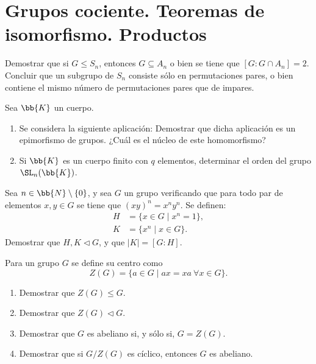 \section{Grupos cociente. Teoremas de isomorfismo. Productos}

\begin{ejercicio}
    Demostrar que si $G\leq S_n$, entonces $G\subseteq A_n$ o bien se tiene que $[G:G\cap A_n]=2$. Concluir que un subgrupo de $S_n$ consiste sólo en permutaciones pares, o bien contiene el mismo número de permutaciones pares que de impares.
\end{ejercicio}

\begin{ejercicio}
    Sea $\bb{K}$ un cuerpo.
    \begin{enumerate}
        \item Se considera la siguiente aplicación:
        Demostrar que dicha aplicación es un epimorfismo de grupos. ¿Cuál es el núcleo de este homomorfismo?

        \item Si $\bb{K}$ es un cuerpo finito con $q$ elementos, determinar el orden del grupo $\SL_n(\bb{K})$.
    \end{enumerate}
\end{ejercicio}

\begin{ejercicio}
    Sea $n\in \bb{N}\setminus \{0\}$, y sea $G$ un grupo verificando que para todo par de elementos $x,y\in G$ se tiene que $(xy)^n=x^ny^n$. Se definen:
    \begin{align*}
        H &= \{x\in G\mid x^n=1\},\\
        K &= \{x^n\mid x\in G\}.
    \end{align*}
    Demostrar que $H,K\lhd G$, y que $|K|=[G:H]$.
\end{ejercicio}

\begin{ejercicio}
    Para un grupo $G$ se define su centro como
    \[
        Z(G) = \{a\in G\mid ax=xa\ \forall x\in G\}.
    \]
    \begin{enumerate}
        \item Demostrar que $Z(G)\leq G$.
        \item Demostrar que $Z(G)\lhd G$.
        \item Demostrar que $G$ es abeliano si, y sólo si, $G=Z(G)$.
        \item Demostrar que si $G/Z(G)$ es cíclico, entonces $G$ es abeliano.
    \end{enumerate}
\end{ejercicio}

